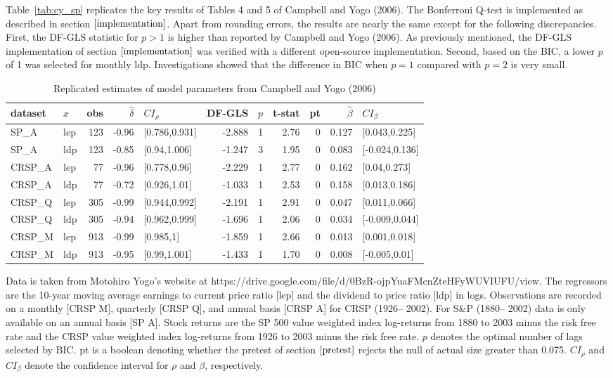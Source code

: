 \documentclass{article}
\begin{document}
Table~\vref{tab:cy_sp} replicates the key results of Tables 4 and 5 of Campbell and Yogo (2006). The Bonferroni Q-test is implemented as described in section $\ref{implementation}$. Apart from rounding errors, the results are nearly the same except for the following discrepancies. First, the DF-GLS statistic for $p>1$ is higher than reported by Campbell and Yogo (2006).  As previously mentioned, the DF-GLS implementation of section $\ref{implementation}$ was verified with a different open-source implementation. Second, based on the BIC, a lower $p$ of 1 was selected for monthly ldp. Investigations showed that the difference in BIC when $p=1$ compared with $p=2$ is very small. 
\begin{table}[ht]
\centering
\caption{Replicated estimates of model parameters from Campbell and Yogo (2006)}
\label{tab:cy_sp}
\begin{threeparttable}
\begin{tabular}{llrrlrrrrrl}
  \hline
dataset & $x$ & obs & $\hat{\delta}$ & $CI_{\rho}$ & DF-GLS & $p$ &t-stat & pt & $\hat{\beta}$ & $CI_{\beta}$ \\ 
  \hline
  SP\_A & lep & 123 & -0.96 & [0.786,0.931] & -2.888 & 1 & 2.76 & 0 & 0.127 & [0.043,0.225] \\ 
  SP\_A & ldp & 123 & -0.85 & [0.94,1.006] & -1.247 & 3 & 1.95 & 0 & 0.083 & [-0.024,0.136] \\ 
  CRSP\_A & lep & 77 & -0.96 & [0.778,0.96] & -2.229 & 1 & 2.77 & 0 & 0.162 & [0.04,0.273] \\ 
  CRSP\_A & ldp & 77 & -0.72 & [0.926,1.01] & -1.033 & 1 & 2.53 & 0 & 0.158 & [0.013,0.186] \\ 
  CRSP\_Q & lep & 305 & -0.99 & [0.944,0.992] & -2.191 & 1 & 2.91 & 0 & 0.047 & [0.011,0.066] \\ 
  CRSP\_Q & ldp & 305 & -0.94 & [0.962,0.999] & -1.696 & 1 & 2.06 & 0 & 0.034 & [-0.009,0.044] \\ 
  CRSP\_M & lep & 913 & -0.99 & [0.985,1] & -1.859 & 1 & 2.66 & 0 & 0.013 & [0.001,0.018] \\ 
  CRSP\_M & ldp & 913 & -0.95 & [0.99,1.001] & -1.433 & 1 & 1.70 & 0 & 0.008 & [-0.005,0.01] \\ 
\hline
\end{tabular}
 \begin{tablenotes}
 \small
\item Data is taken from Motohiro Yogo's website at https://drive.google.com/file/d/0BzR-ojpYuaFMcnZteHFyWUVIUFU/view. The regressors are the 10-year moving average earnings to current price ratio [lep] and the dividend to price ratio [ldp] in logs. Observations are recorded on a monthly [CRSP M], quarterly [CRSP Q], and annual basis [CRSP A] for CRSP (1926– 2002). For S\&P (1880– 2002) data is only available on an annual basis [SP A]. Stock returns are the SP 500 value weighted index log-returns from 1880 to 2003 minus the risk free rate and the CRSP value weighted index log-returns from 1926 to 2003 minus the risk free rate. $p$ denotes the optimal number of lags selected by BIC. pt is a boolean denoting whether the pretest of section $\ref{pretest}$ rejects the null of actual size greater than 0.075. $CI_{\rho}$ and $CI_{\beta}$ denote the confidence interval for $\rho$ and $\beta$, respectively.

\end{tablenotes}
\end{threeparttable}
\end{table}
\end{document}
